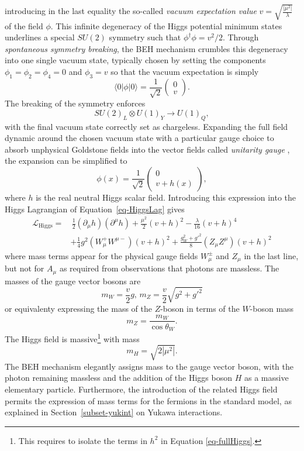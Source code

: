 introducing in the last equality the so-called \textit{vacuum expectation value} $v = \sqrt{\frac{|\mu^2|}{\lambda}}$ of the field $\phi$. This infinite degeneracy of the Higgs potential minimum states underlines a special $SU(2)$ symmetry such that $\phi^{\dagger} \phi = v^2/2$. Through \textit{spontaneous symmetry breaking}, the BEH mechanism crumbles this degeneracy into one single vacuum state, typically chosen by setting the components $\phi_1 = \phi_2 = \phi_4 = 0$ and $\phi_3 = v$ so that the vacuum expectation is simply
\begin{equation}
\langle0|\phi|0 \rangle = \frac{1}{\sqrt{2}} \begin{pmatrix}
        0\\ 
        v
    \end{pmatrix}.
\end{equation}
The breaking of the symmetry enforces \[ SU(2)_L \otimes U(1)_Y \rightarrow U(1)_Q,\] with the final vacuum state correctly set as chargeless. Expanding the full field dynamic around the chosen vacuum state with a particular gauge choice to absorb unphysical Goldstone fields into the vector fields called \textit{unitarity gauge} \cite{PhysRevD.7.1068}, the expansion can be simplified to 
\begin{equation}
    \phi(x) = \frac{1}{\sqrt{2}} \begin{pmatrix}
            0\\ 
            v + h(x)
        \end{pmatrix},
\end{equation}
where $h$ is the real neutral Higgs scalar field. Introducing this expression into the Higgs Lagrangian of Equation~\ref{eq-HiggsLag} gives
\begin{equation}\label{eq-fullHiggs}
    \begin{split}
        \mathcal{L}_{\text{Higgs}} = & \,\frac{1}{2} (\partial_\mu h)(\partial^\mu h) + \frac{\mu^2}{2}(v+h)^2  - \frac{\lambda}{16}(v+h)^4 \\
        &+ \frac{1}{4} g^2 (W_{\mu}^+W^{\mu-})(v+h)^2 + \frac{g^2_W + {g'}^2}{8}(Z_{\mu}Z^{\mu})(v+h)^2 
    \end{split}
\end{equation}
where mass terms appear for the physical gauge fields $W_{\mu}^{\pm}$ and $Z_\mu$ in the last line, but not for $A_{\mu}$ as required from observations that photons are massless. The masses of the gauge vector bosons are
\begin{equation}
    m_W = \frac{v}{2} g , \, m_Z = \frac{v}{2}\sqrt{g^2 +g'^2} 
\end{equation}
or equivalenty expressing the mass of the $Z$-boson in terms of the $W$-boson mass \[m_Z = \frac{m_W}{\cos\theta_W}.\] The Higgs field is massive\footnote{This requires to isolate the terms in $h^2$ in Equation \ref{eq-fullHiggs}.} with mass \[m_H = \sqrt{2|\mu^2|}.\]
The BEH mechanism elegantly assigns mass to the gauge vector boson, with the photon remaining massless and the addition of the Higgs boson $H$ as a massive elementary particle. Furthermore, the introduction of the related Higgs field permits the expression of mass terms for the fermions in the standard model, as explained in Section~\ref{subset-yukint} on Yukawa interactions. 

